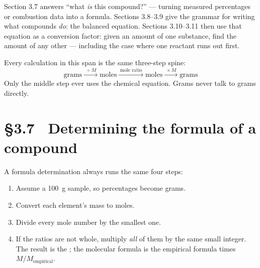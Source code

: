 \documentclass{apchem-worksheet}
\begin{document}
\apctitleblock

\begin{apcnote}
Section 3.7 answers ``what \emph{is} this compound?'' --- turning measured
percentages or combustion data into a formula. Sections 3.8--3.9 give the
grammar for writing what compounds \emph{do}: the balanced equation.
Sections 3.10--3.11 then use that equation as a conversion factor: given an
amount of one substance, find the amount of any other --- including the
case where one reactant runs out first.

Every calculation in this span is the same three-step spine:
\[ \text{grams} \xrightarrow{\;\div M\;} \text{moles}
   \xrightarrow{\;\text{mole ratio}\;} \text{moles}
   \xrightarrow{\;\times M\;} \text{grams} \]
Only the middle step ever uses the chemical equation. Grams never talk to
grams directly.
\end{apcnote}

\section*{\sffamily \S3.7 \textbullet\ Determining the formula of a
compound}

A formula determination always runs the same four steps:

\begin{enumerate}[leftmargin=*,itemsep=0.2em]
  \item Assume a \SI{100}{\gram} sample, so percentages become grams.
  \item Convert each element's mass to moles.
  \item Divide every mole number by the smallest one.
  \item If the ratios are not whole, multiply \emph{all} of them by the
        same small integer. The result is the ;
        the molecular formula is the empirical formula times
        $M / M_{\text{empirical}}$.
\end{enumerate}
\end{document}
